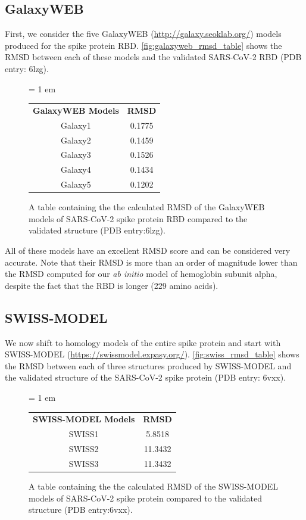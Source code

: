\FloatBarrier
{}
\subsection{GalaxyWEB}

First, we consider the five GalaxyWEB (\url{http://galaxy.seoklab.org/}) models produced for the spike protein RBD. \autoref{fig:galaxyweb_rmsd_table} shows the RMSD between each of these models and the validated SARS-CoV-2 RBD (PDB entry: 6lzg).

\begin{figure}[h]
	\centering
	\tabcolsep = 1 em
	\mySfFamily
	\begin{tabular}{c c}
		\textbf{GalaxyWEB Models} & \textbf{RMSD} \\
		Galaxy1 & 0.1775 \\
		Galaxy2 & 0.1459 \\
		Galaxy3 & 0.1526 \\
		Galaxy4 & 0.1434 \\
		Galaxy5 & 0.1202 \\
	\end{tabular}
	\caption{A table containing the the calculated RMSD of the GalaxyWEB models of SARS-CoV-2 spike protein RBD compared to the validated structure (PDB entry:6lzg).}
	\label{fig:galaxyweb_rmsd_table}
\end{figure}

All of these models have an excellent RMSD score and can be considered very accurate. Note that their RMSD is more than an order of magnitude lower than the RMSD computed for our \textit{ab initio} model of hemoglobin subunit alpha, despite the fact that the RBD is longer (229 amino acids).

\FloatBarrier
{}
\subsection{SWISS-MODEL}

We now shift to homology models of the entire spike protein and start with SWISS-MODEL (\url{https://swissmodel.expasy.org/}). \autoref{fig:swiss_rmsd_table} shows the RMSD between each of three structures produced by SWISS-MODEL and the validated structure of the SARS-CoV-2 spike protein (PDB entry: 6vxx).

\begin{figure}[h]
	\centering
	\tabcolsep = 1 em
	\mySfFamily
	\begin{tabular}{c c}
		\textbf{SWISS-MODEL Models} & \textbf{RMSD} \\
		SWISS1 & 5.8518 \\
		SWISS2 & 11.3432 \\
		SWISS3 & 11.3432 \\
	\end{tabular}
	\caption{A table containing the the calculated RMSD of the SWISS-MODEL models of SARS-CoV-2 spike protein compared to the validated structure (PDB entry:6vxx).}
	\label{fig:swiss_rmsd_table}
\end{figure}

